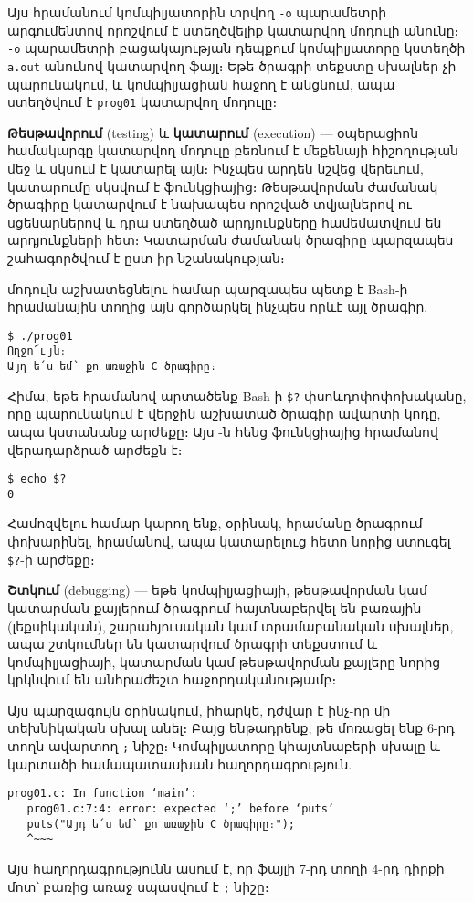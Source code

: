 Այս հրամանում կոմպիլյատորին տրվող \verb|-o| պարամետրի արգումենտով
որոշվում է ստեղծվելիք կատարվող մոդուլի անունը։ \verb|-o| պարամետրի
բացակայության դեպքում կոմպիլյատորը կստեղծի \verb|a.out| անունով
կատարվող ֆայլ։ Եթե ծրագրի տեքստը սխալներ չի պարունակում, և կոմպիլյացիան
հաջող է անցնում, ապա ստեղծվում է \verb|prog01| կատարվող մոդուլը։

\textbf{Թեսթավորում} (testing) և \textbf{կատարում} (execution) ---
օպերացիոն համակարգը կատարվող մոդուլը բեռնում է մեքենայի հիշողության
մեջ և սկսում է կատարել այն։ Ինչպես արդեն նշվեց վերեւում, կատարումը
սկսվում է  ֆունկցիայից։ Թեսթավորման ժամանակ ծրագիրը
կատարվում է նախապես որոշված տվյալներով ու սցենարներով և դրա ստեղծած
արդյունքները համեմատվում են արդյունքների հետ։ Կատարման ժամանակ ծրագիրը
պարզապես շահագործվում է ըստ իր նշանակության։

 մոդուլն աշխատեցնելու համար պարզապես պետք է Bash-ի
հրամանային տողից այն գործարկել ինչպես որևէ այլ ծրագիր.

\begin{Verbatim}
$ ./prog01
Ողջո՜ւյն։
Այդ ե՛ս եմ՝ քո առաջին C ծրագիրը։
\end{Verbatim}

Հիմա, եթե  հրամանով արտածենք Bash-ի \verb|$?|
փսոևդոփոփոխականը, որը պարունակում է վերջին աշխատած ծրագիր ավարտի
կոդը, ապա կստանանք  արժեքը։ Այս -ն հենց 
ֆունկցիայից  հրամանով վերադարձրած արժեքն է։

\begin{Verbatim}
$ echo $?
0
\end{Verbatim}

Համոզվելու համար կարող ենք, օրինակ,  հրամանը
ծրագրում փոխարինել,  հրամանով, ապա կատարելուց
հետո նորից ստուգել \verb|$?|-ի արժեքը։

\textbf{Շտկում} (debugging) --- եթե կոմպիլյացիայի, թեսթավորման
կամ կատարման քայլերում ծրագրում հայտնաբերվել են բառային (լեքսիկական),
շարահյուսական կամ տրամաբանական սխալներ,  ապա շտկումներ են կատարվում
ծրագրի տեքստում և կոմպիլյացիայի, կատարման կամ թեսթավորման քայլերը
նորից կրկնվում են անհրաժեշտ հաջորդականությամբ։

Այս պարզագույն օրինակում, իհարկե, դժվար է ինչ-որ մի տեխնիկական
սխալ անել։ Բայց ենթադրենք, թե մոռացել ենք 6-րդ տողն ավարտող
\verb|;| նիշը։ Կոմպիլյատորը կհայտնաբերի սխալը և կարտածի
համապատասխան հաղորդագրություն.

\begin{Verbatim}
prog01.c: In function ‘main’:
   prog01.c:7:4: error: expected ‘;’ before ‘puts’
   puts("Այդ ե՛ս եմ՝ քո առաջին C ծրագիրը։");
   ^~~~
\end{Verbatim}

Այս հաղորդագրությունն ասում է, որ  ֆայլի 7-րդ տողի 4-րդ
դիրքի մոտ՝  բառից առաջ սպասվում է \verb|;| նիշը։

